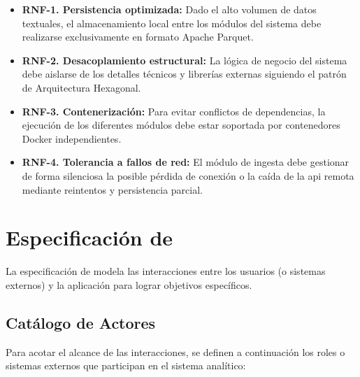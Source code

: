 \begin{itemize}
	\item \textbf{RNF-1. Persistencia optimizada:} Dado el alto volumen de datos textuales, el almacenamiento local entre los módulos del sistema debe realizarse exclusivamente en formato Apache Parquet.
	\item \textbf{RNF-2. Desacoplamiento estructural:} La lógica de negocio del sistema debe aislarse de los detalles técnicos y librerías externas siguiendo el patrón de Arquitectura Hexagonal.
	\item \textbf{RNF-3. Contenerización:} Para evitar conflictos de dependencias, la ejecución de los diferentes módulos debe estar soportada por contenedores Docker independientes.
	\item \textbf{RNF-4. Tolerancia a fallos de red:} El módulo de ingesta debe gestionar de forma silenciosa la posible pérdida de conexión o la caída de la \acrshort{api} remota mediante reintentos y persistencia parcial.
\end{itemize}

\section{Especificación de }
La especificación de  modela las interacciones entre los usuarios (o sistemas externos) y la aplicación para lograr objetivos específicos.

\subsection{Catálogo de Actores}
Para acotar el alcance de las interacciones, se definen a continuación los
roles o sistemas externos que participan en el sistema analítico:

